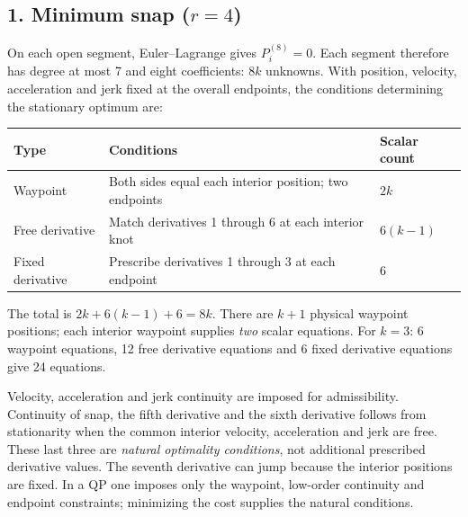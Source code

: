 \documentclass[11pt]{article}
\begin{document}
\subsection*{1. Minimum snap ($r=4$)}
On each open segment, Euler--Lagrange gives $P_i^{(8)}=0$.
Each segment therefore has degree at most 7 and eight coefficients: $8k$ unknowns.
With position, velocity, acceleration and jerk fixed at the overall endpoints,
the conditions determining the stationary optimum are:
\begin{center}
\begin{tabular}{lll}\toprule
Type & Conditions & Scalar count\\\midrule
Waypoint & Both sides equal each interior position; two endpoints & $2k$\\
Free derivative & Match derivatives 1 through 6 at each interior knot & $6(k-1)$\\
Fixed derivative & Prescribe derivatives 1 through 3 at each endpoint & $6$\\\bottomrule
\end{tabular}
\end{center}
The total is $2k+6(k-1)+6=8k$. There are $k+1$ physical waypoint positions;
each interior waypoint supplies \emph{two} scalar equations.
For $k=3$: 6 waypoint equations, 12 free derivative equations and 6 fixed derivative equations give 24 equations.

Velocity, acceleration and jerk continuity are imposed for admissibility.
Continuity of snap, the fifth derivative and the sixth derivative follows from
stationarity when the common interior velocity, acceleration and jerk are free.
These last three are \emph{natural optimality conditions}, not additional
prescribed derivative values. The seventh derivative can jump because the
interior positions are fixed. In a QP one imposes only the waypoint, low-order
continuity and endpoint constraints; minimizing the cost supplies the natural conditions.
\end{document}
